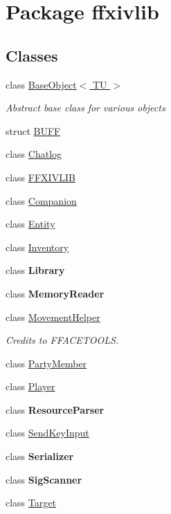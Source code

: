 \hypertarget{namespaceffxivlib}{\section{Package ffxivlib}
\label{namespaceffxivlib}
}
\subsection*{Classes}
\begin{DoxyCompactItemize}
\item 
class \hyperlink{classffxivlib_1_1_base_object_3_01_t_u_01_4}{Base\-Object$<$ T\-U $>$}
\begin{DoxyCompactList}\small\item\em Abstract base class for various objects \end{DoxyCompactList}\item 
struct \hyperlink{structffxivlib_1_1_b_u_f_f}{B\-U\-F\-F}
\item 
class \hyperlink{classffxivlib_1_1_chatlog}{Chatlog}
\item 
class \hyperlink{classffxivlib_1_1_f_f_x_i_v_l_i_b}{F\-F\-X\-I\-V\-L\-I\-B}
\item 
class \hyperlink{classffxivlib_1_1_companion}{Companion}
\item 
class \hyperlink{classffxivlib_1_1_entity}{Entity}
\item 
class \hyperlink{classffxivlib_1_1_inventory}{Inventory}
\item 
class {\bfseries Library}
\item 
class {\bfseries Memory\-Reader}
\item 
class \hyperlink{classffxivlib_1_1_movement_helper}{Movement\-Helper}
\begin{DoxyCompactList}\small\item\em Credits to F\-F\-A\-C\-E\-T\-O\-O\-L\-S. \end{DoxyCompactList}\item 
class \hyperlink{classffxivlib_1_1_party_member}{Party\-Member}
\item 
class \hyperlink{classffxivlib_1_1_player}{Player}
\item 
class {\bfseries Resource\-Parser}
\item 
class \hyperlink{classffxivlib_1_1_send_key_input}{Send\-Key\-Input}
\item 
class {\bfseries Serializer}
\item 
class {\bfseries Sig\-Scanner}
\item 
class \hyperlink{classffxivlib_1_1_target}{Target}
\end{DoxyCompactItemize}
